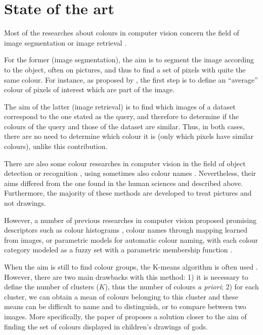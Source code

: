 \documentclass[11pt,a4paper]{article}
\begin{document}
\section{State of the art}
Most of the researches about colours in computer vision concern the field of image segmentation \cite[see \textit{e.g.}][]{ChengSun2000,ChenPappasMojsilovicEtAl2005,HanmandluVermaSusanEtAl2013} or image retrieval \cite[see \textit{e.g.}][]{DengManjunathKenneyEtAl2001,RaoKumar2015,ZhangZhangYaoEtAl2016}.

For the former (image segmentation), the aim is to segment the image according to the object, often on pictures, and thus to find a set of pixels with quite the same colour. For instance, as proposed by \citet[][p. 445]{GonzalezWoods2008}, the first step is to define an ``average'' colour of pixels of interest which are part of the image.

The aim of the latter (image retrieval) is to find which images of a dataset correspond to
the one stated as the query, and therefore to determine if the colours of the query and those of the dataset are similar. 
Thus, in both cases, there are no need to determine which colour it is (only which pixels have similar colours), unlike this contribution.


There are also some colour researches in computer vision in the field of object detection or recognition \cite[see \textit{e.g.}]{khan2012}, using sometimes also colour names \cite[see \textit{e.g.}]{khan2013}. 
Nevertheless, their aims differed from the one found in the human sciences and described above. Furthermore, the majority of these methods are developed to treat pictures and not drawings.

However, a number of previous researches in computer vision proposed promising
descriptors such as colour histograms \cite[see \textit{e.g.}][]{sun2006}, colour names
\cite{weijer2009, lindner2013} through mapping learned from images, or parametric models for automatic colour naming, with each colour category modeled as a fuzzy set with a parametric membership function \cite{benavente2008}.  


When the aim is still to find colour groups, the
K-means algorithm is often used \cite[see e.g.][]{yendrikhovskij2001,konyushkova2015,hulee2007}. However, there are two main
drawbacks with this method: 1) it is necessary to define the number of
clusters ($K$), thus the number of colours \textit{a priori}; 2) for each cluster,
we can obtain a mean of colours belonging to this cluster and these
means can be difficult to name and to distinguish, or to compare between two images.
More specifically, the paper of \citet{konyushkova2015} proposes a solution closer to the aim of finding
the set of colours displayed in children's drawings of gods.
\end{document}
